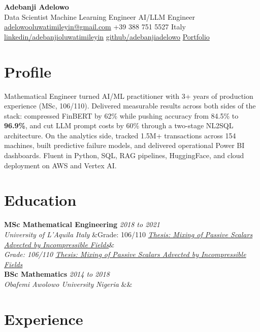 \documentclass[10pt,a4paper]{article}
\newcommand{\cventry}[5]{%
  \noindent\textbf{#1} \hfill \textit{#2}\\
  \textit{#3} \hfill \textit{#4}%
  \ifx&#5&\else\\\textit{#5}\fi
  \vspace{2pt}
}
\begin{document}
\begin{center}
  {\LARGE\bfseries\color{VividPurple} Adebanji Adelowo}\\[4pt]
  {\large Data Scientist \textbar{} Machine Learning Engineer \textbar{} AI/LLM Engineer}\\[4pt]
  \small
  \href{mailto:adelowooluwatimileyin@gmail.com}{adelowooluwatimileyin@gmail.com} \quad
  +39 388 751 5527 \quad
  Italy \quad
  \href{https://linkedin.com/in/adebanjioluwatimileyin}{linkedin/adebanjioluwatimileyin} \quad
  \href{https://github.com/adebanjiadelowo}{github/adebanjiadelowo} \quad
  \href{https://adebanjioluwatimileyin.github.io/}{Portfolio}
\end{center}

\vspace{-4pt}

\section{Profile}
Mathematical Engineer turned AI/ML practitioner with 3+ years of production experience (MSc, 106/110). Delivered measurable results across both sides of the stack: compressed FinBERT by 62\% while pushing accuracy from 84.5\% to \textbf{96.9\%}, and cut LLM prompt costs by 60\% through a two-stage NL2SQL architecture. On the analytics side, tracked 1.5M+ transactions across 154 machines, built predictive failure models, and delivered operational Power BI dashboards. Fluent in Python, SQL, RAG pipelines, HuggingFace, and cloud deployment on AWS and Vertex AI.

\section{Education}

\cventry{MSc Mathematical Engineering}{2018 to 2021}{University of L'Aquila}{Italy}{Grade: 106/110 \quad \textit{\href{https://github.com/AdebanjiAdelowo/Master-Thesis}{Thesis: Mixing of Passive Scalars Advected by Incompressible Fields}}} \\
\cventry{BSc Mathematics}{2014 to 2018}{Obafemi Awolowo University}{Nigeria}{}

\section{Experience}
\end{document}
